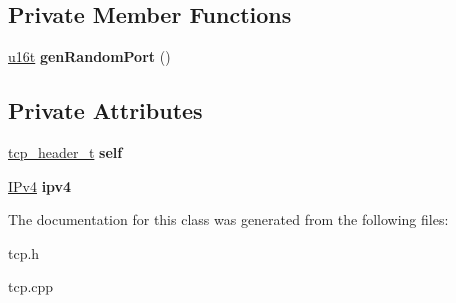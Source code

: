 \subsection*{Private Member Functions}
\begin{DoxyCompactItemize}
\item 
\mbox{\label{classTcp_a5f8fee77a1e98bbf3e38419e14cd2b20}} 
\hyperlink{macros_8h_a590a9a8f7df8fabfac6573e21da1922d}{u16t} {\bfseries gen\+Random\+Port} ()
\end{DoxyCompactItemize}
\subsection*{Private Attributes}
\begin{DoxyCompactItemize}
\item 
\mbox{\label{classTcp_a8d534d9756bb2da25562007ea4f7d892}} 
\hyperlink{structtcp__header__t}{tcp\+\_\+header\+\_\+t} {\bfseries self}
\item 
\mbox{\label{classTcp_af11f1b485c7082948b0c97d4e1fd1fb5}} 
\hyperlink{classIPv4}{I\+Pv4} {\bfseries ipv4}
\end{DoxyCompactItemize}


The documentation for this class was generated from the following files\+:\begin{DoxyCompactItemize}
\item 
tcp.\+h\item 
tcp.\+cpp\end{DoxyCompactItemize}
